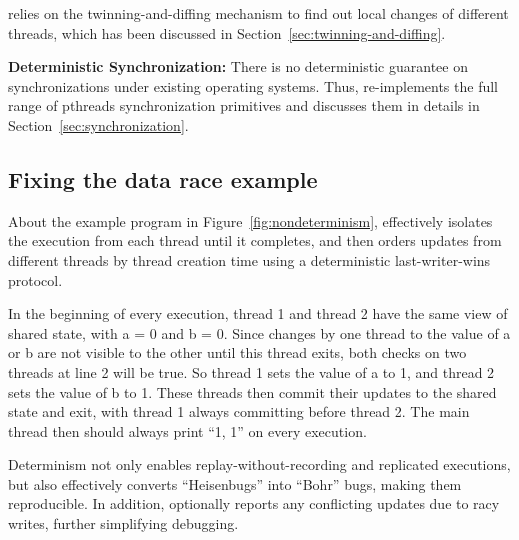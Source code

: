 \dthreads{} relies on the twinning-and-diffing mechanism to find out local changes of different threads, which has been discussed in Section~\ref{sec:twinning-and-diffing}. 

\textbf{Deterministic Synchronization:}
There is no deterministic guarantee on synchronizations under existing operating systems. Thus, \dthreads{} re-implements the full range of pthreads synchronization primitives and discusses  them in details in Section~\ref{sec:synchronization}. 

\subsection{Fixing the data race example} 
About the example program in Figure~\ref{fig:nondeterminism},  \dthreads{} effectively isolates the execution from each thread until it completes, and then orders updates from different threads by thread creation time using a deterministic last-writer-wins protocol.

In the beginning of every execution, thread 1 and thread 2 have the same view of shared state, with a = 0 and b = 0. Since changes by one thread to the value of a or b are not visible to the other until this thread exits, both checks on two threads at line 2 will be true. So thread 1 sets the value of a to 1, and thread 2 sets the value of b to 1. These threads then commit their updates to the shared state and exit, with thread 1 always committing before thread 2. The main thread then should always print ``1, 1'' on every execution.

Determinism not only enables replay-without-recording and replicated executions, but also effectively converts ``Heisenbugs'' into ``Bohr'' bugs, making them reproducible. In addition, \dthreads{} optionally reports any conflicting updates due to racy writes, further simplifying debugging.
